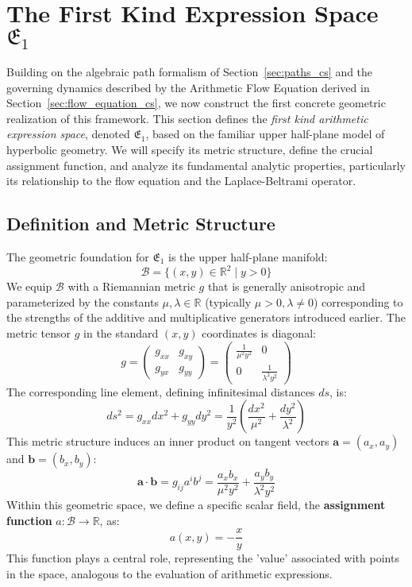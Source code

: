 \documentclass[12pt]{article}
\begin{document}
\section{The First Kind Expression Space \( \mathfrak{E}_1 \)} %

Building on the algebraic path formalism of Section~\ref{sec:paths_cs} %
and the governing dynamics described by the Arithmetic Flow Equation derived in Section~\ref{sec:flow_equation_cs}, %
we now construct the first concrete geometric realization of this framework. This section defines the \emph{first kind arithmetic expression space}, denoted \( \mathfrak{E}_1 \), based on the familiar upper half-plane model of hyperbolic geometry. We will specify its metric structure, define the crucial assignment function, and analyze its fundamental analytic properties, particularly its relationship to the flow equation and the Laplace-Beltrami operator.

\subsection{Definition and Metric Structure} %

The geometric foundation for \( \mathfrak{E}_1 \) is the upper half-plane manifold:
\[
\mathcal{B} = \{ (x, y) \in \mathbb{R}^2 \mid y > 0 \}
\]
We equip \( \mathcal{B} \) with a Riemannian metric \( g \) that is generally anisotropic and parameterized by the constants \( \mu, \lambda \in \mathbb{R} \) (typically \( \mu > 0, \lambda \neq 0 \)) corresponding to the strengths of the additive and multiplicative generators introduced earlier. The metric tensor \( g \) in the standard \( (x, y) \) coordinates is diagonal:
\[
g = \begin{pmatrix} g_{xx} & g_{xy} \\ g_{yx} & g_{yy} \end{pmatrix} = \begin{pmatrix} \frac{1}{\mu^2 y^2} & 0 \\ 0 & \frac{1}{\lambda^2 y^2} \end{pmatrix}
\]
The corresponding line element, defining infinitesimal distances \( ds \), is:
\begin{equation}
ds^2 = g_{xx} dx^2 + g_{yy} dy^2 = \frac{1}{y^2}\left(\frac{dx^2}{\mu^2} + \frac{dy^2}{\lambda^2}\right) \label{eq:metric_general_cs}
\end{equation}
This metric structure induces an inner product on tangent vectors \( \mathbf{a} = (a_x, a_y) \) and \( \mathbf{b} = (b_x, b_y) \):
\[
\mathbf{a} \cdot \mathbf{b} = g_{ij} a^i b^j = \frac{a_x b_x}{\mu^2 y^2} + \frac{a_y b_y}{\lambda^2 y^2}
\]
Within this geometric space, we define a specific scalar field, the \textbf{assignment function} \( a: \mathcal{B} \to \mathbb{R} \), as:
\begin{equation}\label{eq:genassignment_cs}
a(x, y) = - \frac{x}{y}
\end{equation}
This function plays a central role, representing the 'value' associated with points in the space, analogous to the evaluation of arithmetic expressions.
\end{document}
